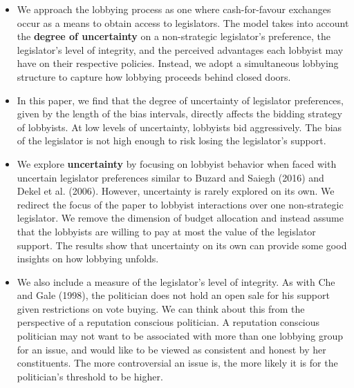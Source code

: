 \documentclass[a4paper,12pt]{article}
\begin{document}
\begin{enumerate}
\begin{itemize}
\item We approach the lobbying process as one where cash-for-favour exchanges occur as a means to obtain access to legislators. The model takes into account the \textbf{degree of uncertainty} on a non-strategic legislator’s preference, the legislator’s level of integrity, and the perceived advantages each lobbyist may have on their respective policies. Instead, we adopt a simultaneous lobbying structure to capture how lobbying proceeds behind closed doors.
\item In this paper, we find that the degree of uncertainty of legislator preferences, given by the length of the bias intervals, directly affects the bidding strategy of lobbyists. At low levels of uncertainty, lobbyists bid aggressively. The bias of the legislator is not high enough to risk losing the legislator’s support. 
\item We explore \textbf{uncertainty} by focusing on lobbyist behavior when faced with uncertain legislator preferences similar to Buzard and Saiegh (2016) and Dekel et al. (2006).  However, uncertainty is rarely explored on its own. We redirect the focus of the paper to lobbyist interactions over one non-strategic legislator. We remove the dimension of budget allocation and instead assume that the lobbyists are willing to pay at most the value of the legislator support. The results show that uncertainty on its own can provide some good insights on how lobbying unfolds. 
\item We also include a measure of the legislator’s level of integrity. As with Che and Gale (1998), the politician does not hold an open sale for his support given restrictions on vote buying. We can think about this from the perspective of a reputation conscious politician. A reputation conscious politician may not want to be associated with more than one lobbying group for an issue, and would like to be viewed as consistent and honest by her constituents. The more controversial an issue is, the more likely it is for the politician’s threshold to be higher. 

\end{itemize}

\end{enumerate}
\end{document}
